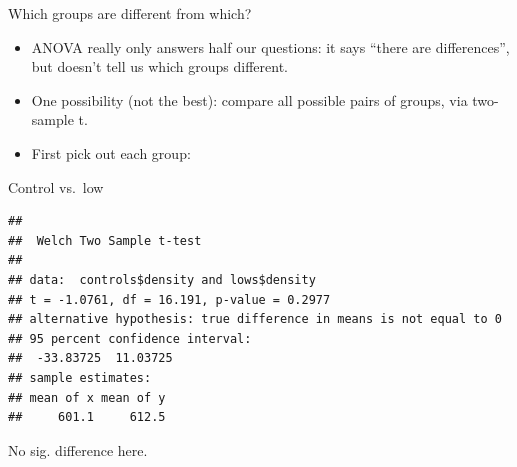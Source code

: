 \documentclass[ignorenonframetext,]{beamer}
\newenvironment{Shaded}{\begin{snugshade}}{\end{snugshade}}
\newcommand{\KeywordTok}[1]{\textcolor[rgb]{0.13,0.29,0.53}{\textbf{#1}}}
\newcommand{\NormalTok}[1]{#1}
\newcommand{\OperatorTok}[1]{\textcolor[rgb]{0.81,0.36,0.00}{\textbf{#1}}}
\newcommand{\StringTok}[1]{\textcolor[rgb]{0.31,0.60,0.02}{#1}}
\providecommand{\tightlist}{%
  \setlength{\itemsep}{0pt}\setlength{\parskip}{0pt}}
\begin{document}
\begin{frame}[fragile]{Which groups are different from which?}
\protect\hypertarget{which-groups-are-different-from-which}{}

\begin{itemize}
\tightlist
\item
  ANOVA really only answers half our questions: it says ``there are
  differences'', but doesn't tell us which groups different.
\item
  One possibility (not the best): compare all possible pairs of groups,
  via two-sample t.
\item
  First pick out each group:
\end{itemize}

\begin{Shaded}
\end{Shaded}

\end{frame}

\begin{frame}[fragile]{Control vs.~low}
\protect\hypertarget{control-vs.low}{}

\begin{Shaded}
\end{Shaded}

\begin{verbatim}
## 
##  Welch Two Sample t-test
## 
## data:  controls$density and lows$density
## t = -1.0761, df = 16.191, p-value = 0.2977
## alternative hypothesis: true difference in means is not equal to 0
## 95 percent confidence interval:
##  -33.83725  11.03725
## sample estimates:
## mean of x mean of y 
##     601.1     612.5
\end{verbatim}

No sig. difference here.

\end{frame}
\end{document}
